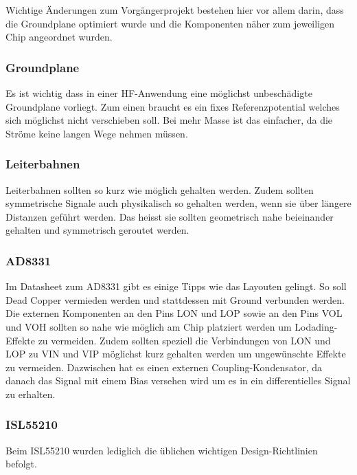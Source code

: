 Wichtige Änderungen zum Vorgängerprojekt bestehen hier vor allem darin, dass die Groundplane optimiert wurde und die Komponenten näher zum jeweiligen Chip angeordnet wurden.

\subsubsection*{Groundplane}
Es ist wichtig dass in einer HF-Anwendung eine möglichst unbeschädigte Groundplane vorliegt. Zum einen braucht es ein fixes Referenzpotential welches sich möglichst nicht verschieben soll. Bei mehr Masse ist das einfacher, da die Ströme keine langen Wege nehmen müssen.

\subsubsection*{Leiterbahnen}
Leiterbahnen sollten so kurz wie möglich gehalten werden. Zudem sollten symmetrische Signale auch physikalisch so gehalten werden, wenn sie über längere Distanzen geführt werden. Das heisst sie sollten geometrisch nahe beieinander gehalten und symmetrisch geroutet werden. 

\subsubsection*{AD8331}
Im Datasheet zum AD8331 gibt es einige Tipps wie das Layouten gelingt. So soll Dead Copper vermieden werden und stattdessen mit Ground verbunden werden.
Die externen Komponenten an den Pins LON und LOP sowie an den Pins VOL und VOH sollten so nahe wie möglich am Chip platziert werden um Lodading-Effekte zu vermeiden.
Zudem sollten speziell die Verbindungen von LON und LOP zu VIN und VIP möglichst kurz gehalten werden um ungewünschte Effekte zu vermeiden. Dazwischen hat es einen externen Coupling-Kondensator, da danach das Signal mit einem Bias versehen wird um es in ein differentielles Signal zu erhalten.

\subsubsection*{ISL55210}
Beim ISL55210 wurden lediglich die üblichen wichtigen Design-Richtlinien befolgt. 

